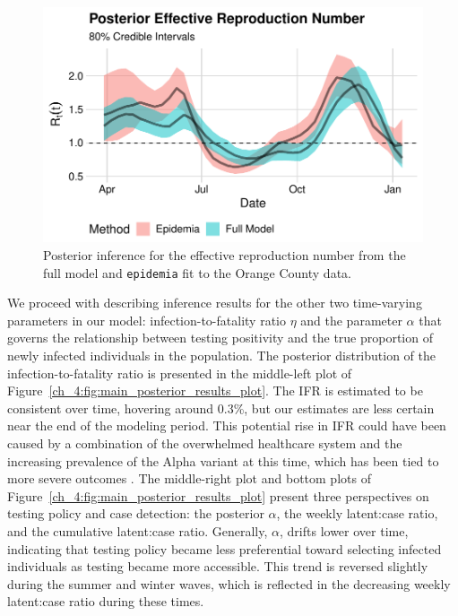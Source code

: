 \begin{figure}[htbp]
    \centering
    \includegraphics[width=1.0\columnwidth]{rt_comparison_oc_data_plot}
    \caption[Comparison of posterior inference for full model and \texttt{epidemia} fit to the Orange County data.]{Posterior inference for the effective reproduction number from the full model and \texttt{epidemia} fit to the Orange County data.}
    \label{ch_4:fig:rt_comparison_oc_data_plot}
\end{figure}
\par
We proceed with describing inference results for the other two time-varying parameters in our model: infection-to-fatality ratio \( \eta \)
and the parameter $\alpha$ that governs the relationship between testing positivity and the true proportion of newly infected individuals in the population.
The posterior distribution of the infection-to-fatality ratio is presented in the middle-left plot of Figure~\ref{ch_4:fig:main_posterior_results_plot}.
The IFR is estimated to be consistent over time, hovering around 0.3\%, but our estimates are less certain near the end of the modeling period.
This potential rise in IFR could have been caused by a combination of the overwhelmed healthcare system and the increasing prevalence of the Alpha variant at this time, which has been tied to more severe outcomes \citep{grint2021severity}.
The middle-right plot and bottom plots of Figure~\ref{ch_4:fig:main_posterior_results_plot} present three perspectives on testing policy and case detection: the posterior \( \alpha \), the weekly latent:case ratio, and the cumulative latent:case ratio.
Generally, \( \alpha \), drifts lower over time, indicating that testing policy became less preferential toward selecting infected individuals as testing became more accessible.
This trend is reversed slightly during the summer and winter waves, which is reflected in the decreasing weekly latent:case ratio during these times.
